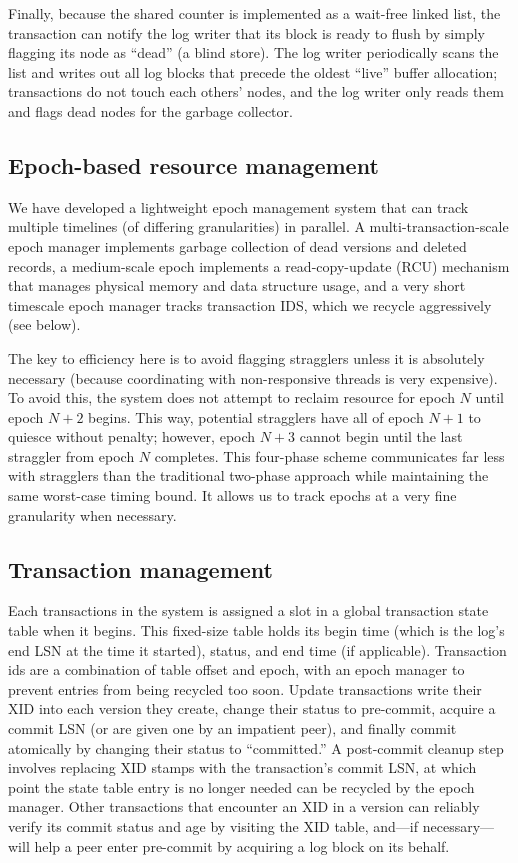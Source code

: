 Finally, because the shared counter is implemented as a wait-free linked list, the transaction can notify the log writer that its block is ready to flush by simply flagging its node as ``dead'' (a blind store). The log writer periodically scans the list and writes out all log blocks that precede the oldest ``live'' buffer allocation; transactions do not touch each others' nodes, and the log writer only reads them and flags dead nodes for the garbage collector.

\subsection{Epoch-based resource management}
We have developed a lightweight epoch management system that can track multiple timelines (of differing granularities) in parallel. A multi-transaction-scale epoch manager implements garbage collection of dead versions and deleted records, a medium-scale epoch implements a read-copy-update (RCU) mechanism that manages physical memory and data structure usage\cite{RCU}, and a very short timescale epoch manager tracks transaction IDS, which we recycle aggressively (see below).

The key to efficiency here is to avoid flagging stragglers unless it is absolutely necessary (because coordinating with non-responsive threads is very expensive). To avoid this, the system does not attempt to reclaim resource for epoch $N$ until epoch $N+2$ begins. This way, potential stragglers have all of epoch $N+1$ to quiesce without penalty; however, epoch $N+3$ cannot begin until the last straggler from epoch $N$ completes. This four-phase scheme communicates far less with stragglers than the traditional two-phase approach while maintaining the same worst-case timing bound. It allows us to track epochs at a very fine granularity when necessary. 

\subsection{Transaction management}

Each transactions in the system is assigned a slot in a global transaction state table when it begins. This fixed-size table holds its begin time (which is the log's end LSN at the time it started), status, and end time (if applicable). Transaction ids are a combination of table offset and epoch, with an epoch manager to prevent entries from being recycled too soon. Update transactions write their XID into each version they create, change their status to pre-commit, acquire a commit LSN (or are given one by an impatient peer), and finally commit atomically by changing their status to ``committed.'' A post-commit cleanup step involves replacing XID stamps with the transaction's commit LSN, at which point the state table entry is no longer needed can be recycled by the epoch manager. Other transactions that encounter an XID in a version can reliably verify its commit status and age by visiting the XID table, and---if necessary---will help a peer enter pre-commit by acquiring a log block on its behalf. 

